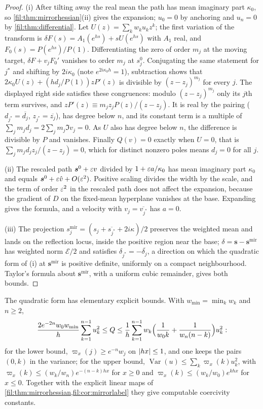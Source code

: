 \begin{proof}
(i) After tilting away the real mean the path has mean imaginary part $\kappa_0$, so
\cref{fil:thm:mirrorhessian}\textup{(ii)} gives the expansion; $u_0=0$ by anchoring and $u_n=0$ by
\cref{fil:thm:differential}. Let $U(z)=\sum_kw_ku_kz^k$; the first variation of the transform is
$\delta F(s)=A_1(e^{hs})+sU(e^{hs})$ with $A_1$ real, and $F_0(s)=P(e^{hs})/P(1)$. Differentiating the zero of order
$m_j$ at the moving target, $\delta F+v_jF_0'$ vanishes to order $m_j$ at $s_j^0$. Conjugating the same statement
for $j^*$ and shifting by $2i\kappa_0$ (note $e^{2i\kappa_0h}=1$), subtraction shows that
$2\kappa_0U(z)+(hd_j/P(1))zP'(z)$ is divisible by $(z-z_j)^{m_j}$ for every $j$. The displayed right side satisfies
these congruences: modulo $(z-z_j)^{m_j}$ only its $j$th term survives, and $zP'(z)\equiv m_jz_jP(z)/(z-z_j)$. It is
real by the pairing ($d_{j^*}=\overline{d_j}$, $z_{j^*}=\overline{z_j}$), has degree below $n$, and its constant term is a
multiple of $\sum_jm_jd_j=2\sum_jm_j\Im v_j=0$. As $U$ also has degree below $n$, the difference is divisible by $P$
and vanishes. Finally $Q(v)=0$ exactly when $U=0$, that is $\sum_jm_jd_jz_j/(z-z_j)=0$, which for distinct nonzero
poles means $d_j=0$ for all $j$.

(ii) The rescaled path $\boldsymbol s^0+\varepsilon v$ divided by $1+\varepsilon a/\kappa_0$ has mean imaginary part $\kappa_0$ and equals
$\boldsymbol s^0+\varepsilon\hat v+O(\varepsilon^2)$. Positive scaling divides the width by the scale, and the term of order $\varepsilon^2$ in
the rescaled path does not affect the expansion, because the gradient of $D$ on the fixed-mean hyperplane vanishes
at the base. Expanding gives the formula, and a velocity with $v_j=\overline{v_{j^*}}$ has $a=0$.

(iii) The projection $s_j^{\mathrm{mir}}=(s_j+\overline{s_{j^*}}+2i\kappa)/2$ preserves the weighted mean and lands on the
reflection locus, inside the positive region near the base; $\delta=\boldsymbol s-\boldsymbol s^{\mathrm{mir}}$ has weighted
norm $\mathcal E/2$ and satisfies $\delta_{j^*}=-\overline{\delta_j}$, a direction on which the quadratic form of \textup{(i)} at
$\boldsymbol s^{\mathrm{mir}}$ is positive definite, uniformly on a compact neighbourhood. Taylor's formula about
$\boldsymbol s^{\mathrm{mir}}$, with a uniform cubic remainder, gives both bounds.
\end{proof}

The quadratic form has elementary explicit bounds. With $w_{\min}=\min_kw_k$ and $n\ge2$,
\[
 \frac{2e^{-2n}w_0w_{\min}}h\sum_{k=1}^{n-1}u_k^2\le Q
 \le\frac1h\sum_{k=1}^{n-1}w_k\Bigl(\frac1{w_0k}+\frac1{w_n(n-k)}\Bigr)u_k^2 :
\]
for the lower bound, $\varpi_x(j)\ge e^{-n}w_j$ on $\lvert hx\rvert\le1$, and one keeps the pairs $(0,k)$ in the variance; for
the upper bound, $\operatorname{Var}(u)\le\sum_k\varpi_x(k)u_k^2$, with $\varpi_x(k)\le(w_k/w_n)e^{-(n-k)hx}$ for $x\ge0$ and
$\varpi_x(k)\le(w_k/w_0)e^{khx}$ for $x\le0$. Together with the explicit linear maps of
\cref{fil:thm:mirrorhessian,fil:cor:mirrorlabel} they give computable coercivity constants.

